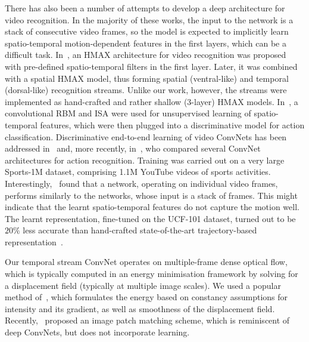 \documentclass{article} %
\begin{document}
There has also been a number of attempts to develop a deep architecture for video recognition. In the majority of these works, the input to the network is a stack of consecutive video
frames, so the model is expected to implicitly learn spatio-temporal motion-dependent features in the first layers, which can be a difficult task.
In~\cite{Jhuang07}, an HMAX architecture for video recognition was proposed with pre-defined spatio-temporal filters in the first layer.
Later, it was combined~\cite{Kuehne11} with a spatial HMAX model, thus forming spatial (ventral-like) and temporal (dorsal-like) recognition streams. 
Unlike our work, however, the streams were implemented as hand-crafted and rather shallow (3-layer) HMAX models.
In~\cite{Taylor10,Chen10,Le11}, a convolutional RBM and ISA were used for unsupervised learning of spatio-temporal features, which were then plugged into a discriminative model for action classification.
Discriminative end-to-end learning of video ConvNets has been addressed in~\cite{Ji13} and, more recently, in~\cite{Karpathy14}, who compared several ConvNet architectures for action recognition.
Training was carried out on a very large Sports-1M dataset, comprising 1.1M YouTube videos of sports activities.
Interestingly,~\cite{Karpathy14} found that a network, operating on individual video frames, performs similarly to the networks, whose input is a stack of frames.
This might indicate that the learnt spatio-temporal features do not capture the motion well.
The learnt representation, fine-tuned on the UCF-101 dataset, turned out to be $20\%$ less accurate than hand-crafted state-of-the-art trajectory-based representation~\cite{Wang13c,Peng14}. 

Our temporal stream ConvNet operates on multiple-frame dense optical flow, which
is typically computed in an energy minimisation framework by solving for a displacement field (typically at multiple image scales). 
We used a popular method of~\cite{Brox04}, which formulates the energy based on constancy assumptions for intensity and its gradient, as well as smoothness of the
displacement field. Recently,~\cite{Weinzaepfel13} proposed an image patch matching scheme, which is reminiscent of deep ConvNets, but does not incorporate learning.
\end{document}
